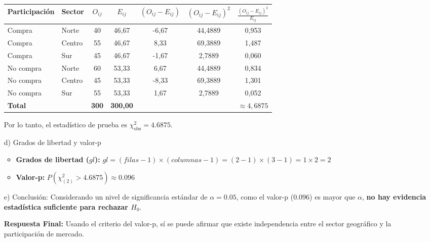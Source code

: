 \documentclass[12pt,a4paper]{article}
\begin{document}
\begin{itemize}
    \begin{center}
        \begin{tabular}{llccccc}
            \toprule
            Participación & Sector & $O_{ij}$ & $E_{ij}$ & $(O_{ij} - E_{ij})$ & $(O_{ij} - E_{ij})^2$ & $\frac{(O_{ij} - E_{ij})^2}{E_{ij}}$ \\
            \midrule
            Compra & Norte & 40 & 46,67 & -6,67 & 44,4889 & 0,953 \\
            Compra & Centro & 55 & 46,67 & 8,33 & 69,3889 & 1,487 \\
            Compra & Sur & 45 & 46,67 & -1,67 & 2,7889 & 0,060 \\
            \midrule
            No compra & Norte & 60 & 53,33 & 6,67 & 44,4889 & 0,834 \\
            No compra & Centro & 45 & 53,33 & -8,33 & 69,3889 & 1,301 \\
            No compra & Sur & 55 & 53,33 & 1,67 & 2,7889 & 0,052 \\
            \midrule
            \textbf{Total} & & \textbf{300} & \textbf{300,00} & & & \textbf{$\approx 4,6875$} \\
            \bottomrule
        \end{tabular}
    \end{center}
    
    Por lo tanto, el estadístico de prueba es $\chi^2_{\text{obs}} = 4.6875$.
    
    \item [d)] Grados de libertad y valor-p
    \begin{itemize}
        \item \textbf{Grados de libertad ($gl$):} $gl = (filas - 1) \times (columnas - 1) = (2 - 1) \times (3 - 1) = 1 \times 2 = 2$
        \item \textbf{Valor-p:} $P(\chi^2_{(2)} > 4.6875) \approx 0.096$
    \end{itemize}
    
    \item [e)] Conclusión:
    Considerando un nivel de significancia estándar de $\alpha = 0.05$, como el valor-p ($0.096$) es mayor que $\alpha$, \textbf{no hay evidencia estadística suficiente para rechazar $H_0$}.
    \vspace{0.5cm}
    
    \noindent\textbf{Respuesta Final:} Usando el criterio del valor-p, sí se puede afirmar que existe independencia entre el sector geográfico y la participación de mercado.
\end{itemize}
\end{document}
